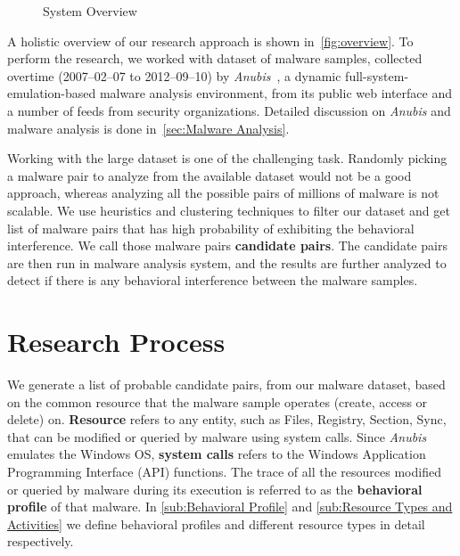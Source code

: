 \begin{figure}[h]
    \centering
    \def\svgwidth{\columnwidth}
    \scalebox{0.7}{}
\caption{System Overview}
\label{fig:overview}
\end{figure}

A holistic overview of our research approach is shown in~\autoref{fig:overview}.
To perform the research, we worked with dataset of {\gettotalmalwarei{}} malware samples, collected overtime (2007--02--07 to 2012--09--10) by \emph{Anubis}~\cite[]{anubis}, a dynamic full-system-emulation-based malware analysis environment, from its public web interface and a number of feeds from security organizations.
Detailed discussion on \emph{Anubis} and malware analysis is done in~\autoref{sec:Malware Analysis}.

Working with the large dataset is one of the challenging task.
Randomly picking a malware pair to analyze from the available dataset would not be a good approach, whereas analyzing all the possible pairs of millions of malware is not scalable.
We use heuristics and clustering techniques to filter our dataset and get list of malware pairs that has high probability of exhibiting the behavioral interference.
We call those malware pairs \textbf{candidate pairs}.
The candidate pairs are then run in malware analysis system, and the results are further analyzed to detect if there is any behavioral interference between the malware samples.

\section{Research Process}
\label{sec:Research Process}
We generate a list of probable candidate pairs, from our malware dataset, based on the common resource that the malware sample operates (create, access or delete) on.
\textbf{Resource} refers to any entity, such as Files, Registry, Section, Sync, that can be modified or queried by malware using system calls.
Since \emph{Anubis} emulates the Windows OS, \textbf{system calls} refers to the Windows Application Programming Interface (API) functions.
The trace of all the resources modified or queried by malware during its execution is referred to as the \textbf{behavioral profile} of that malware.
In \autoref{sub:Behavioral Profile} and \autoref{sub:Resource Types and Activities} we define behavioral profiles and different resource types in detail respectively.

